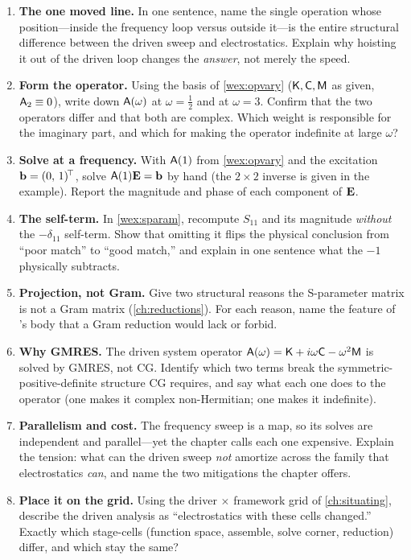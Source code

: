 \exercisessection
\begin{enumerate}[nosep]
  \item \textbf{The one moved line.} In one sentence, name the single operation
  whose position---inside the frequency loop versus outside it---is the entire
  structural difference between the driven sweep and electrostatics. Explain why
  hoisting it out of the driven loop changes the \emph{answer}, not merely the
  speed.
  \item \textbf{Form the operator.} Using the basis of
  \cref{wex:opvary} ($\mathsf{K},\mathsf{C},\mathsf{M}$ as given, $\mathsf{A}_2\equiv0$), write down
  $\mathsf{A}(\omega)$ at $\omega = \tfrac12$ and at $\omega = 3$. Confirm that the two
  operators differ and that both are complex. Which weight is responsible for the
  imaginary part, and which for making the operator indefinite at large $\omega$?
  \item \textbf{Solve at a frequency.} With $\mathsf{A}(1)$ from \cref{wex:opvary} and
  the excitation $\mathbf{b} = (0,\,1)^{\!\top}$, solve $\mathsf{A}(1)\mathbf{E} = \mathbf{b}$ by hand
  (the $2\times2$ inverse is given in the example). Report the magnitude and phase
  of each component of $\mathbf{E}$.
  \item \textbf{The self-term.} In \cref{wex:sparam}, recompute $S_{11}$ and its
  magnitude \emph{without} the $-\delta_{11}$ self-term. Show that omitting it flips
  the physical conclusion from ``poor match'' to ``good match,'' and explain in one
  sentence what the $-1$ physically subtracts.
  \item \textbf{Projection, not Gram.} Give two structural reasons the S-parameter
  matrix is not a Gram matrix (\cref{ch:reductions}). For each reason, name the
  feature of 's body that a Gram reduction would lack or
  forbid.
  \item \textbf{Why GMRES.} The driven system operator
  $\mathsf{A}(\omega) = \mathsf{K} + i\omega\mathsf{C} - \omega^2\mathsf{M}$ is solved by GMRES, not CG.
  Identify which two terms break the symmetric-positive-definite structure CG
  requires, and say what each one does to the operator (one makes it complex
  non-Hermitian; one makes it indefinite).
  \item \textbf{Parallelism and cost.} The frequency sweep is a map, so its solves
  are independent and parallel---yet the chapter calls each one expensive. Explain
  the tension: what can the driven sweep \emph{not} amortize across the family that
  electrostatics \emph{can}, and name the two mitigations the chapter offers.
  \item \textbf{Place it on the grid.} Using the driver $\times$ framework grid of
  \cref{ch:situating}, describe the driven analysis as ``electrostatics with these
  cells changed.'' Exactly which stage-cells (function space, assemble, solve
  corner, reduction) differ, and which stay the same?
\end{enumerate}
